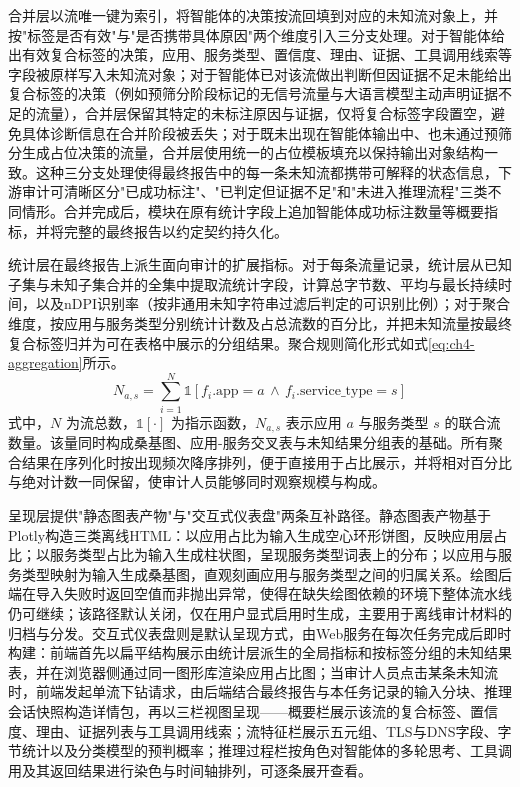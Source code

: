 合并层以流唯一键为索引，将智能体的决策按流回填到对应的未知流对象上，并按"标签是否有效"与"是否携带具体原因"两个维度引入三分支处理。对于智能体给出有效复合标签的决策，应用、服务类型、置信度、理由、证据、工具调用线索等字段被原样写入未知流对象；对于智能体已对该流做出判断但因证据不足未能给出复合标签的决策（例如预筛分阶段标记的无信号流量与大语言模型主动声明证据不足的流量），合并层保留其特定的未标注原因与证据，仅将复合标签字段置空，避免具体诊断信息在合并阶段被丢失；对于既未出现在智能体输出中、也未通过预筛分生成占位决策的流量，合并层使用统一的占位模板填充以保持输出对象结构一致。这种三分支处理使得最终报告中的每一条未知流都携带可解释的状态信息，下游审计可清晰区分"已成功标注"、"已判定但证据不足"和"未进入推理流程"三类不同情形。合并完成后，模块在原有统计字段上追加智能体成功标注数量等概要指标，并将完整的最终报告以约定契约持久化。

统计层在最终报告上派生面向审计的扩展指标。对于每条流量记录，统计层从已知子集与未知子集合并的全集中提取流统计字段，计算总字节数、平均与最长持续时间，以及nDPI识别率（按非通用未知字符串过滤后判定的可识别比例）；对于聚合维度，按应用与服务类型分别统计计数及占总流数的百分比，并把未知流量按最终复合标签归并为可在表格中展示的分组结果。聚合规则简化形式如式\eqref{eq:ch4-aggregation}所示。
\begin{equation}\label{eq:ch4-aggregation}
  N_{a,s} = \sum_{i=1}^{N} \mathbb{1}[f_i.\mathrm{app} = a \,\wedge\, f_i.\mathrm{service\_type} = s]
\end{equation}
式中，$N$ 为流总数，$\mathbb{1}[\cdot]$ 为指示函数，$N_{a,s}$ 表示应用 $a$ 与服务类型 $s$ 的联合流数量。该量同时构成桑基图、应用-服务交叉表与未知结果分组表的基础。所有聚合结果在序列化时按出现频次降序排列，便于直接用于占比展示，并将相对百分比与绝对计数一同保留，使审计人员能够同时观察规模与构成。

呈现层提供"静态图表产物"与"交互式仪表盘"两条互补路径。静态图表产物基于Plotly构造三类离线HTML：以应用占比为输入生成空心环形饼图，反映应用层占比；以服务类型占比为输入生成柱状图，呈现服务类型词表上的分布；以应用与服务类型映射为输入生成桑基图，直观刻画应用与服务类型之间的归属关系。绘图后端在导入失败时返回空值而非抛出异常，使得在缺失绘图依赖的环境下整体流水线仍可继续；该路径默认关闭，仅在用户显式启用时生成，主要用于离线审计材料的归档与分发。交互式仪表盘则是默认呈现方式，由Web服务在每次任务完成后即时构建：前端首先以扁平结构展示由统计层派生的全局指标和按标签分组的未知结果表，并在浏览器侧通过同一图形库渲染应用占比图；当审计人员点击某条未知流时，前端发起单流下钻请求，由后端结合最终报告与本任务记录的输入分块、推理会话快照构造详情包，再以三栏视图呈现——概要栏展示该流的复合标签、置信度、理由、证据列表与工具调用线索；流特征栏展示五元组、TLS与DNS字段、字节统计以及分类模型的预判概率；推理过程栏按角色对智能体的多轮思考、工具调用及其返回结果进行染色与时间轴排列，可逐条展开查看。

